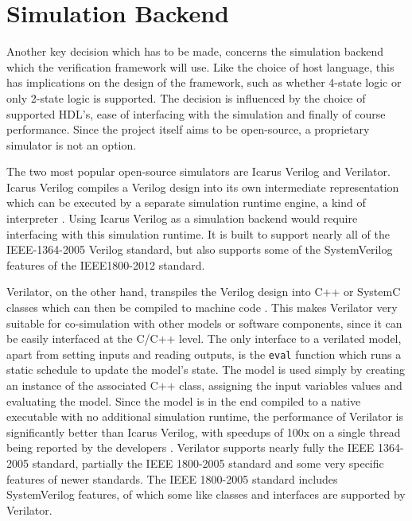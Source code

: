 \section{Simulation Backend} %

Another key decision which has to be made, concerns the simulation backend which the verification framework will use.
Like the choice of host language, this has implications on the design of the framework, such as whether 4-state logic
or only 2-state logic is supported.
The decision is influenced by the choice of supported HDL's, ease of interfacing with the simulation and
finally of course performance. Since the project itself aims to be open-source, a proprietary simulator
is not an option. 

The two most popular open-source simulators are Icarus Verilog and Verilator. Icarus Verilog
compiles a Verilog design into its own intermediate representation which can be executed by a separate simulation
runtime engine, a kind of interpreter \cite{iverilog}. Using Icarus Verilog as a simulation backend would require
interfacing with this simulation runtime. It is built to support nearly all of the IEEE-1364-2005 Verilog standard,
but also supports some of the SystemVerilog features of the IEEE1800-2012 standard.

Verilator, on the other hand, transpiles the Verilog design into C++ or SystemC classes which can then be compiled
to machine code \cite{verilator}. This makes Verilator very suitable for co-simulation with other models
or software components, since it can be easily interfaced at the C/C++ level. The only interface to a verilated
model, apart from setting inputs and reading outputs, is the \texttt{eval} function which runs a static schedule to
update the model's state. The model is used simply by creating an instance of the associated C++ class, assigning the
input variables values and evaluating the model. Since the model is in the end compiled to a native executable with
no additional simulation
runtime, the performance of Verilator is significantly better than Icarus Verilog, with speedups of 100x on a single
thread being reported by the developers \cite{verilator}. Verilator supports nearly fully the IEEE 1364-2005
standard, partially the IEEE 1800-2005 standard and some very specific features of newer standards. The IEEE
1800-2005 standard includes SystemVerilog features, of which some like classes and interfaces are supported by Verilator.

